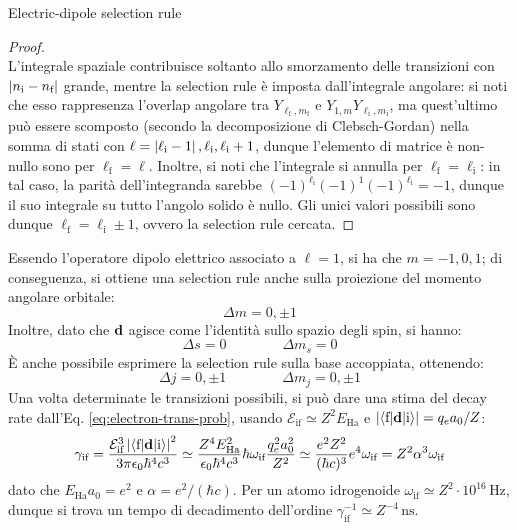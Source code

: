 \begin{theorem}{Electric-dipole selection rule}{}
\begin{proof}
\begin{equation*}
		\end{equation*}
		L'integrale spaziale contribuisce soltanto allo smorzamento delle transizioni con $ \left\lvert n_\text{i} - n_\text{f}\right\rvert $ grande, mentre la selection rule è imposta dall'integrale angolare: si noti che esso rappresenza l'overlap angolare tra $ Y_{\ell_\text{f} , m_\text{f}} $ e $ Y_{1,m} Y_{\ell_\text{i} , m_\text{i}} $, ma quest'ultimo può essere scomposto (secondo la decomposizione di Clebsch-Gordan) nella somma di stati con $ \ell = \left\lvert\ell_\text{i} - 1\right\rvert, \ell_\text{i}, \ell_\text{i} + 1 $, dunque l'elemento di matrice è non-nullo sono per $ \ell_\text{f} = \ell $. Inoltre, si noti che l'integrale si annulla per $ \ell_\text{f} = \ell_\text{i} $: in tal caso, la parità dell'integranda sarebbe $ (-1)^{\ell_\text{i}} (-1)^1 (-1)^{\ell_\text{i}} = -1 $, dunque il suo integrale su tutto l'angolo solido è nullo. Gli unici valori possibili sono dunque $ \ell_\text{f} = \ell_\text{i} \pm 1 $, ovvero la selection rule cercata.
	\end{proof}
\end{theorem}

Essendo l'operatore dipolo elettrico associato a $ \ell = 1 $, si ha che $ m = -1,0,1 $; di conseguenza, si ottiene una selection rule anche sulla proiezione del momento angolare orbitale:
\begin{equation}
	\Delta m = 0, \pm 1
	\label{eq:1-e-el-dip-tr-m}
\end{equation}
Inoltre, dato che $ \mathbf{d} $ agisce come l'identità sullo spazio degli spin, si hanno:
\begin{equation}
	\Delta s = 0
	\qquad \qquad
	\Delta m_s = 0
	\label{eq:1-e-el-dip-tr-spin}
\end{equation}
È anche possibile esprimere la selection rule sulla base accoppiata, ottenendo:
\begin{equation}
	\Delta j = 0 , \pm 1
	\qquad \qquad
	\Delta m_j = 0 , \pm 1
\end{equation}
Una volta determinate le transizioni possibili, si può dare una stima del decay rate dall'Eq. \ref{eq:electron-trans-prob}, usando $ \mathcal{E}_\text{if} \simeq Z^2 E_\text{Ha} $ e $ \left\lvert\braket{\text{f} | \mathbf{d} | \text{i}}\right\rvert = q_e a_0 / Z $:
\begin{equation*}
	\gamma_\text{if} = \frac{\mathcal{E}_\text{if}^3 \left\lvert\braket{\text{f} | \mathbf{d} | \text{i}}\right\rvert^2}{3\pi \epsilon_0 \hbar^4 c^3} \simeq \frac{Z^4 E_\text{Ha}^2}{\epsilon_0 \hbar^4 c^3} \hbar \omega_\text{if} \frac{q_e^2 a_0^2}{Z^2} \simeq \frac{e^2 Z^2}{(\hbar c)^3} e^4 \omega_\text{if} = Z^2 \alpha^3 \omega_\text{if}
\end{equation*}
dato che $ E_\text{Ha} a_0 = e^2 $ e $ \alpha = e^2 / (\hbar c) $. Per un atomo idrogenoide $ \omega_\text{if} \simeq Z^2 \cdot 10^{16} \,\text{Hz} $, dunque si trova un tempo di decadimento dell'ordine $ \gamma_\text{if}^{-1} \simeq Z^{-4} \,\text{ns} $.

